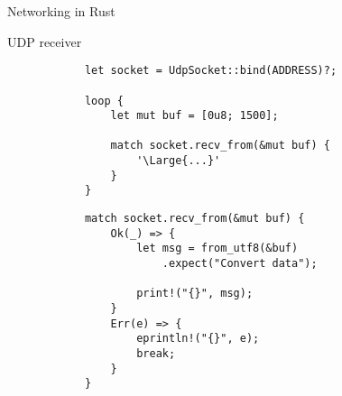 \begin{frame}[fragile]{Networking in Rust}
    \begin{block}{UDP receiver}
        \begin{overprint}
            \begin{verbatim}
            let socket = UdpSocket::bind(ADDRESS)?;

            loop {
                let mut buf = [0u8; 1500];
            
                match socket.recv_from(&mut buf) {
                    '\Large{...}'
                }
            }
            \end{verbatim}

            \begin{verbatim}
            match socket.recv_from(&mut buf) {
                Ok(_) => {
                    let msg = from_utf8(&buf)
                        .expect("Convert data");
        
                    print!("{}", msg);
                }
                Err(e) => {
                    eprintln!("{}", e);
                    break;
                }
            }
            \end{verbatim}
        \end{overprint}
    \end{block}

\end{frame}
